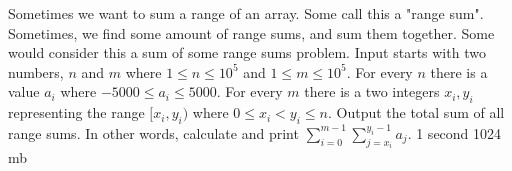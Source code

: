 {Sometimes we want to sum a range of an array. Some call this a "range sum". Sometimes, we find some amount of range sums, and sum them together. Some would consider this a sum of some range sums problem.}
{Input starts with two numbers, $n$ and $m$ where $1 \le n \le 10^5$ and $1 \le m \le 10^5$. For every $n$ there is a value $a_i$ where $-5000 \le a_i \le 5000$. For every $m$ there is a two integers $x_i,y_i$ representing the range $[x_i,y_i)$ where $0 \le x_i < y_i \le n$.}
{Output the total sum of all range sums. In other words, calculate and print $\sum_{i=0}^{m-1} \sum_{j=x_i}^{y_i - 1} a_j$.}
{1 second}
{1024 mb}
{
}